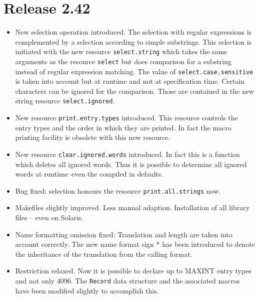 \documentclass[11pt,a4paper]{scrartcl}
\newcommand\rsc[1]{\texttt{#1}}
\newenvironment{Release}[2]{\section*{Release #1}\begin{itemize}}{\end{itemize}}
\newenvironment{Fix}[1]{\item }{}
\newenvironment{New}[1]{\item }{}
\newenvironment{Update}[1]{\item }{}
\begin{document}
 \begin{Release}{2.42}{}
  \begin{New}{gene}
    New selection operation introduced. The selection with regular expressions
    is complemented by a selection according to simple substrings. This
    selection is initiated with the new resource \rsc{select.string}
    which takes the same arguments as the resource \rsc{select} but
    does comparison for a substring instead of regular expression matching.
    The value of \rsc{select.case.sensitive} is taken into account but
    at runtime and not at specification time. Certain characters can be
    ignored for the comparison. Those are contained in the new string resource
    \rsc{select.ignored}.
  \end{New}
  \begin{New}{gene}
    New resource \rsc{print.entry.types} introduced. This resource
    controls the entry types and the order in which they are printed.
    In fact the macro printing facility is obsolete with this new
    resource.
  \end{New}
  \begin{New}{gene}
    New resource \rsc{clear.ignored.words} introduced. In fact this is
    a function which deletes all ignored words. Thus it is possible to
    determine all ignored words at runtime--even the compiled in
    defaults.
  \end{New}
  \begin{Fix}{gene}
    Bug fixed: selection honours the resource \rsc{print.all.strings}
    now.
  \end{Fix}
  \begin{Update}{gene}
    Makefiles slightly improved. Less manual adaption. Installation of all
    library files -- even on Solaris.
  \end{Update}
  \begin{Fix}{gene}
    Name formatting omission fixed: Translation and length are taken
    into account correctly. The new name format sign * has been
    introduced to denote the inheritance of the translation from the
    calling format.
  \end{Fix}
  \begin{Update}{gene}
    Restriction relaxed. Now it is possible to declare up to MAXINT
    entry types and not only 4096. The \verb|Record| data structure
    and the associated macros have been modified slightly to
    accomplish this.
  \end{Update}

\end{Release}
\end{document}
